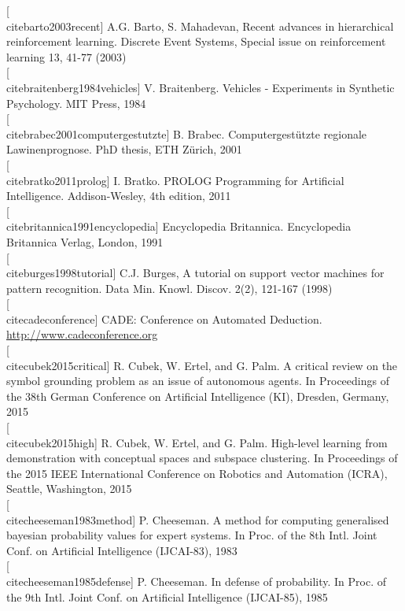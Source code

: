 \documentclass[10pt]{book}
\begin{document}
[\\cite{barto2003recent}] A.G. Barto, S. Mahadevan, Recent advances in hierarchical reinforcement learning. Discrete Event Systems, Special issue on reinforcement learning 13, 41-77 (2003)\\[0pt]
[\\cite{braitenberg1984vehicles}] V. Braitenberg. Vehicles - Experiments in Synthetic Psychology. MIT Press, 1984\\[0pt]
[\\cite{brabec2001computergestutzte}] B. Brabec. Computergestützte regionale Lawinenprognose. PhD thesis, ETH Zürich, 2001\\[0pt]
[\\cite{bratko2011prolog}] I. Bratko. PROLOG Programming for Artificial Intelligence. Addison-Wesley, 4th edition, 2011\\[0pt]
[\\cite{britannica1991encyclopedia}] Encyclopedia Britannica. Encyclopedia Britannica Verlag, London, 1991\\[0pt]
[\\cite{burges1998tutorial}] C.J. Burges, A tutorial on support vector machines for pattern recognition. Data Min. Knowl. Discov. 2(2), 121-167 (1998)\\[0pt]
[\\cite{cadeconference}] CADE: Conference on Automated Deduction. \href{http://www.cadeconference.org}{http://www.cadeconference.org}\\[0pt]
[\\cite{cubek2015critical}] R. Cubek, W. Ertel, and G. Palm. A critical review on the symbol grounding problem as an issue of autonomous agents. In Proceedings of the 38th German Conference on Artificial Intelligence (KI), Dresden, Germany, 2015\\[0pt]
[\\cite{cubek2015high}] R. Cubek, W. Ertel, and G. Palm. High-level learning from demonstration with conceptual spaces and subspace clustering. In Proceedings of the 2015 IEEE International Conference on Robotics and Automation (ICRA), Seattle, Washington, 2015\\[0pt]
[\\cite{cheeseman1983method}] P. Cheeseman. A method for computing generalised bayesian probability values for expert systems. In Proc. of the 8th Intl. Joint Conf. on Artificial Intelligence (IJCAI-83), 1983\\[0pt]
[\\cite{cheeseman1985defense}] P. Cheeseman. In defense of probability. In Proc. of the 9th Intl. Joint Conf. on Artificial Intelligence (IJCAI-85), 1985\\[0pt]
\end{document}
